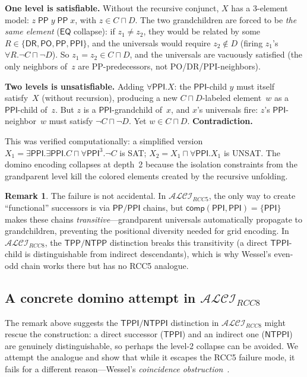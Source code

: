 \documentclass[
]{ceurart}
\theoremstyle{definition}
\newtheorem{remark}[theorem]{Remark}
\newcommand{\ALCIRCC}[1]{\ensuremath{\mathcal{ALCI}_{\mathit{RCC#1}}}}
\newcommand{\DR}{\ensuremath{\mathsf{DR}}}
\newcommand{\PO}{\ensuremath{\mathsf{PO}}}
\newcommand{\EQ}{\ensuremath{\mathsf{EQ}}}
\newcommand{\PP}{\ensuremath{\mathsf{PP}}}
\newcommand{\PPI}{\ensuremath{\mathsf{PPI}}}
\newcommand{\TPP}{\ensuremath{\mathsf{TPP}}}
\newcommand{\NTPP}{\ensuremath{\mathsf{NTPP}}}
\newcommand{\TPPI}{\ensuremath{\mathsf{TPPI}}}
\newcommand{\NTPPI}{\ensuremath{\mathsf{NTPPI}}}
\newcommand{\comp}{\ensuremath{\mathsf{comp}}}
\newcommand{\RCCfive}{\{\DR,\PO,\PP,\PPI\}}
\begin{document}
\medskip\noindent\textbf{One level is satisfiable.}
Without the recursive conjunct, $X$ has a 3-element model:
$z \;\PP\; y \;\PP\; x$, with $z \in C \sqcap D$.
The two grandchildren are forced to be \emph{the same element}
($\EQ$ collapse): if $z_1 \neq z_2$, they would be related by
some $R \in \RCCfive$, and the universals would require $z_2 \notin D$
(firing $z_1$'s $\forall R.\neg C \sqcap \neg D$).
So $z_1 = z_2 \in C \sqcap D$, and the universals are vacuously
satisfied (the only neighbors of~$z$ are PP-predecessors, not
PO/DR/PPI-neighbors).

\medskip\noindent\textbf{Two levels is unsatisfiable.}
Adding $\forall\PPI.X$: the $\PPI$-child $y$ must itself satisfy~$X$
(without recursion), producing a new $C \sqcap D$-labeled element~$w$
as a $\PPI$-child of~$z$.  But $z$ is a $\PPI$-grandchild of~$x$,
and $x$'s universals fire: $z$'s $\PPI$-neighbor~$w$ must satisfy
$\neg C \sqcap \neg D$.  Yet $w \in C \sqcap D$.
\textbf{Contradiction.}

This was verified computationally: a simplified version
$X_1 = \exists\PPI.\exists\PPI.C \sqcap \forall\PPI^3.\neg C$
is SAT; $X_2 = X_1 \sqcap \forall\PPI.X_1$ is UNSAT.
The domino encoding collapses at depth~2 because the isolation
constraints from the grandparent level kill the colored elements
created by the recursive unfolding.

\begin{remark}
The failure is not accidental.  In $\ALCIRCC{5}$, the only way to
create ``functional'' successors is via $\PP/\PPI$ chains, but
$\comp(\PPI,\PPI) = \{\PPI\}$ makes these chains
\emph{transitive}---grandparent universals automatically propagate
to grandchildren, preventing the positional diversity needed for
grid encoding.  In $\ALCIRCC{8}$, the $\TPP/\NTPP$ distinction
breaks this transitivity (a direct $\TPPI$-child is distinguishable
from indirect descendants), which is why Wessel's even-odd chain
works there but has no RCC5 analogue.
\end{remark}

\subsection{A concrete domino attempt in $\ALCIRCC{8}$}
\label{sec:domino-attempt-rcc8}

The remark above suggests the $\TPPI/\NTPPI$ distinction in
$\ALCIRCC{8}$ might rescue the construction: a direct successor
($\TPPI$) and an indirect one ($\NTPPI$) are genuinely
distinguishable, so perhaps the level-2 collapse can be avoided.
We attempt the analogue and show that while it escapes the RCC5
failure mode, it fails for a different reason---Wessel's
\emph{coincidence obstruction}~\cite{Wessel2003}.
\end{document}
